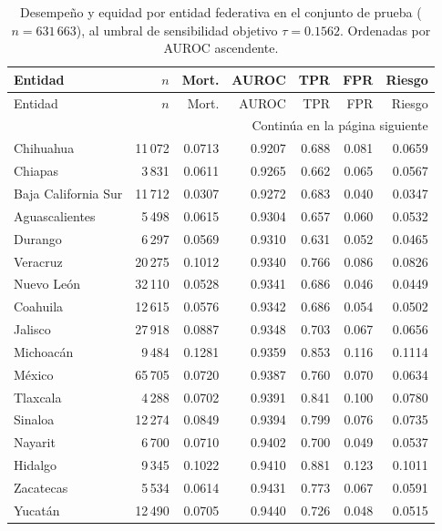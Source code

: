 
\begingroup
\small\setlength{\tabcolsep}{4pt}
\begin{longtable}{l r r r r r r}
\caption{Desempeño y equidad por entidad federativa en el conjunto de prueba
($n=631\,663$), al umbral de sensibilidad objetivo
$\tau=0.1562$. Ordenadas por AUROC ascendente.}
\label{tab:entidad}\\
\toprule
Entidad & $n$ & Mort. & AUROC & TPR & FPR & Riesgo \\
\midrule
\endfirsthead
\toprule
Entidad & $n$ & Mort. & AUROC & TPR & FPR & Riesgo \\
\midrule
\endhead
\midrule
\multicolumn{7}{r}{\footnotesize Continúa en la página siguiente} \\
\endfoot
\bottomrule
\endlastfoot
Chihuahua & 11\,072 & 0.0713 & 0.9207 & 0.688 & 0.081 & 0.0659 \\
Chiapas & 3\,831 & 0.0611 & 0.9265 & 0.662 & 0.065 & 0.0567 \\
Baja California Sur & 11\,712 & 0.0307 & 0.9272 & 0.683 & 0.040 & 0.0347 \\
Aguascalientes & 5\,498 & 0.0615 & 0.9304 & 0.657 & 0.060 & 0.0532 \\
Durango & 6\,297 & 0.0569 & 0.9310 & 0.631 & 0.052 & 0.0465 \\
Veracruz & 20\,275 & 0.1012 & 0.9340 & 0.766 & 0.086 & 0.0826 \\
Nuevo León & 32\,110 & 0.0528 & 0.9341 & 0.686 & 0.046 & 0.0449 \\
Coahuila & 12\,615 & 0.0576 & 0.9342 & 0.686 & 0.054 & 0.0502 \\
Jalisco & 27\,918 & 0.0887 & 0.9348 & 0.703 & 0.067 & 0.0656 \\
Michoacán & 9\,484 & 0.1281 & 0.9359 & 0.853 & 0.116 & 0.1114 \\
México & 65\,705 & 0.0720 & 0.9387 & 0.760 & 0.070 & 0.0634 \\
Tlaxcala & 4\,288 & 0.0702 & 0.9391 & 0.841 & 0.100 & 0.0780 \\
Sinaloa & 12\,274 & 0.0849 & 0.9394 & 0.799 & 0.076 & 0.0735 \\
Nayarit & 6\,700 & 0.0710 & 0.9402 & 0.700 & 0.049 & 0.0537 \\
Hidalgo & 9\,345 & 0.1022 & 0.9410 & 0.881 & 0.123 & 0.1011 \\
Zacatecas & 5\,534 & 0.0614 & 0.9431 & 0.773 & 0.067 & 0.0591 \\
Yucatán & 12\,490 & 0.0705 & 0.9440 & 0.726 & 0.048 & 0.0515 \\

\end{longtable}
